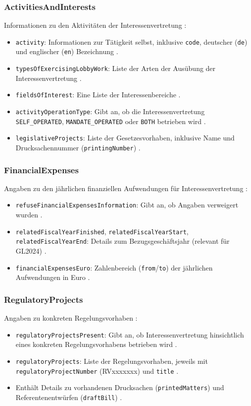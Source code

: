 \documentclass[12pt,twoside=false,a4paper,parskip]{scrbook}
\begin{document}
\subsubsection{ActivitiesAndInterests}
Informationen zu den Aktivitäten der Interessenvertretung :
\begin{itemize}
\item \texttt{activity}: Informationen zur Tätigkeit selbst, inklusive \texttt{code}, deutscher (\texttt{de}) und englischer (\texttt{en}) Bezeichnung .
\item \texttt{typesOfExercisingLobbyWork}: Liste der Arten der Ausübung der Interessenvertretung .
\item \texttt{fieldsOfInterest}: Eine Liste der Interessenbereiche .
\item \texttt{activityOperationType}: Gibt an, ob die Interessenvertretung \texttt{SELF\_OPERATED}, \texttt{MANDATE\_OPERATED} oder \texttt{BOTH} betrieben wird .
\item \texttt{legislativeProjects}: Liste der Gesetzesvorhaben, inklusive Name und Drucksachennummer (\texttt{printingNumber}) .
\end{itemize}

\subsubsection{FinancialExpenses}
Angaben zu den jährlichen finanziellen Aufwendungen für Interessenvertretung :
\begin{itemize}
\item \texttt{refuseFinancialExpensesInformation}: Gibt an, ob Angaben verweigert wurden .
\item \texttt{relatedFiscalYearFinished}, \texttt{relatedFiscalYearStart}, \texttt{relatedFiscalYearEnd}: Details zum Bezugsgeschäftsjahr (relevant für GL2024) .
\item \texttt{financialExpensesEuro}: Zahlenbereich (\texttt{from}/\texttt{to}) der jährlichen Aufwendungen in Euro .
\end{itemize}

\subsubsection{RegulatoryProjects}
Angaben zu konkreten Regelungsvorhaben :
\begin{itemize}
\item \texttt{regulatoryProjectsPresent}: Gibt an, ob Interessenvertretung hinsichtlich eines konkreten Regelungsvorhabens betrieben wird .
\item \texttt{regulatoryProjects}: Liste der Regelungsvorhaben, jeweils mit \texttt{regulatoryProjectNumber} (RVxxxxxxx) und \texttt{title} .
\item Enthält Details zu vorhandenen Drucksachen (\texttt{printedMatters})  und Referentenentwürfen (\texttt{draftBill}) .
\end{itemize}
\end{document}
